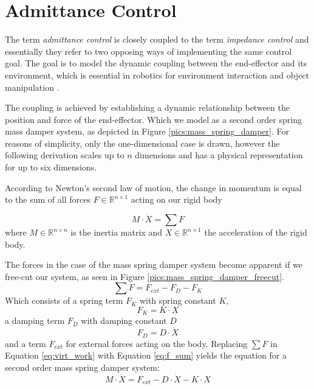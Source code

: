 \chapter{Admittance Control}
	\label{sec:adm_ctrl}
	
The term \emph{admittance control} is closely coupled to the term \emph{impedance control} and essentially they refer to two opposing ways of implementing the same control goal. The goal is to model the dynamic coupling between the end-effector and its environment, which is essential in robotics for environment interaction and object manipulation \citep{hogan1985impedance}.

The coupling is achieved by establishing a dynamic relationship between the position and force of the end-effector. Which we model as a second order spring mass damper system, as depicted in Figure \ref{pics:mass_spring_damper}. For reasons of simplicity, only the one-dimensional case is drawn, however the following derivation scales up to $n$ dimensions and has a physical representation for up to six dimensions.

According to Newton's second law of motion, the change in momentum is equal to the sum of all forces $F \in \mathbb{R}^{n \times 1}$ acting on our rigid body

\begin{equation}
M \cdot \ddot{X} = \sum F
	\label{eq:virt_work}
\end{equation}
where $M \in \mathbb{R}^{n \times n}$ is the inertia matrix and $\ddot{X} \in \mathbb{R}^{n \times 1}$ the acceleration of the rigid body.

The forces in the case of the mass spring damper system become apparent if we free-cut our system, as  seen in Figure \ref{pics:mass_spring_damper_freecut}.
\begin{equation}
\sum F = F_{ext} -F_D - F_K
	\label{eq:f_sum}
\end{equation}
Which consists of a spring term $F_K$ with spring constant $K$,
\begin{equation}
F_K = K \cdot X
\end{equation}
 a damping term $F_D$ with damping constant $D$
\begin{equation}
F_D = D \cdot \dot{X}
\end{equation}
 and a term $F_{ext}$ for external forces acting on the body. Replacing $\sum F$ in Equation \ref{eq:virt_work} with Equation \ref{eq:f_sum} yields the equation for a second order mass spring damper system:
\begin{equation}
M \cdot \ddot{X} = F_{ext} -D \cdot \dot{X} -K \cdot X
	\label{eq:mass_spring_damper_sys}
\end{equation}

